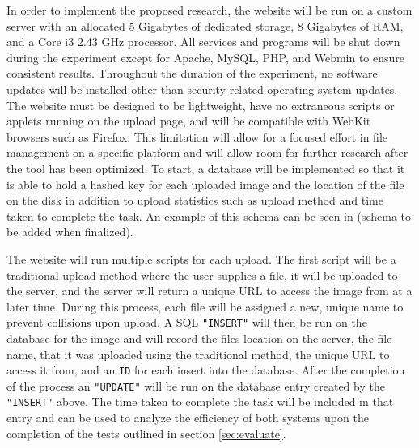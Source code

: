 \documentclass[11pt]{article}
\begin{document}
In order to implement the proposed research, the website will be run on a custom server with an allocated 5 Gigabytes of dedicated storage, 8 Gigabytes of RAM, and a Core i3 2.43 GHz processor. All services and programs will be shut down during the experiment except for Apache, MySQL, PHP, and Webmin to ensure consistent results. Throughout the duration of the experiment, no software updates will be installed other than security related operating system updates. The website must be designed to be lightweight, have no extraneous scripts or applets running on the upload page, and will be compatible with WebKit browsers such as Firefox. This limitation will allow for a focused effort in file management on a specific platform and will allow room for further research after the tool has been optimized. To start, a database will be implemented so that it is able to hold a hashed key for each uploaded image and the location of the file on the disk in addition to upload statistics such as upload method and time taken to complete the task. An example of this schema can be seen in (schema to be added when finalized). %

The website will run multiple scripts for each upload. The first script will be a traditional upload method where the user supplies a file, it will be uploaded to the server, and the server will return a unique URL to access the image from at a later time. During this process, each file will be assigned a new, unique name to prevent collisions upon upload. A SQL {\tt "INSERT"} will then be run on the database for the image and will record the files location on the server, the file name, that it was uploaded using the traditional method, the unique URL to access it from, and an {\tt ID} for each insert into the database. After the completion of the process an {\tt "UPDATE"} will be run on the database entry created by the {\tt "INSERT"} above. The time taken to complete the task will be included in that entry and can be used to analyze the efficiency of both systems upon the completion of the tests outlined in section \ref{sec:evaluate}.
\end{document}
